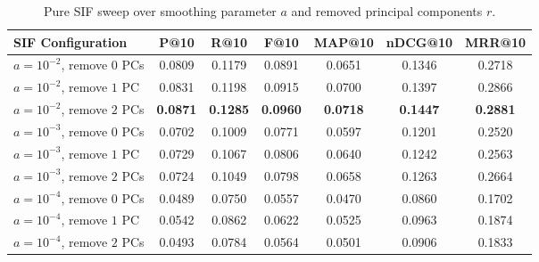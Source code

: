 \documentclass[runningheads]{llncs}
\begin{document}
\begin{table}[h]
\centering
\small
\begin{tabular}{lcccccc}
\toprule
\textbf{SIF Configuration} & \textbf{P@10} & \textbf{R@10} & \textbf{F@10} & \textbf{MAP@10} & \textbf{nDCG@10} & \textbf{MRR@10} \\
\midrule
$a=10^{-2}$, remove $0$ PCs & 0.0809 & 0.1179 & 0.0891 & 0.0651 & 0.1346 & 0.2718 \\
$a=10^{-2}$, remove $1$ PC  & 0.0831 & 0.1198 & 0.0915 & 0.0700 & 0.1397 & 0.2866 \\
$a=10^{-2}$, remove $2$ PCs & \textbf{0.0871} & \textbf{0.1285} & \textbf{0.0960} & \textbf{0.0718} & \textbf{0.1447} & \textbf{0.2881} \\
$a=10^{-3}$, remove $0$ PCs & 0.0702 & 0.1009 & 0.0771 & 0.0597 & 0.1201 & 0.2520 \\
$a=10^{-3}$, remove $1$ PC  & 0.0729 & 0.1067 & 0.0806 & 0.0640 & 0.1242 & 0.2563 \\
$a=10^{-3}$, remove $2$ PCs & 0.0724 & 0.1049 & 0.0798 & 0.0658 & 0.1263 & 0.2664 \\
$a=10^{-4}$, remove $0$ PCs & 0.0489 & 0.0750 & 0.0557 & 0.0470 & 0.0860 & 0.1702 \\
$a=10^{-4}$, remove $1$ PC  & 0.0542 & 0.0862 & 0.0622 & 0.0525 & 0.0963 & 0.1874 \\
$a=10^{-4}$, remove $2$ PCs & 0.0493 & 0.0784 & 0.0564 & 0.0501 & 0.0906 & 0.1833 \\
\bottomrule
\end{tabular}
\caption{Pure SIF sweep over smoothing parameter $a$ and removed principal components $r$.}
\label{tab:sif_config_sweep}
\end{table}
\end{document}
